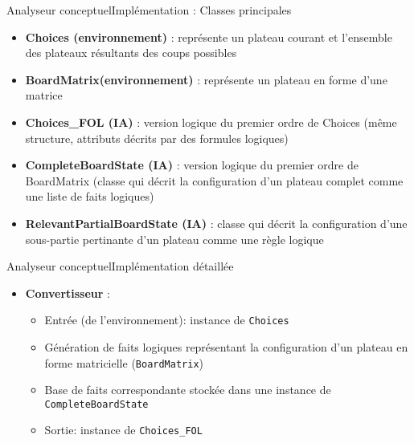 \begin{frame}{Analyseur conceptuel}{Implémentation : Classes principales}
\begin{itemize}
  \item \textbf {Choices (environnement)} : représente un plateau
  courant et l'ensemble des plateaux résultants des coups possibles
  \pause
  \item \textbf {BoardMatrix(environnement)} : représente un plateau en forme
  d'une matrice
  \pause
  \item \textbf {Choices\_FOL (IA)} : version logique du premier ordre de
  Choices (même structure, attributs décrits par des formules logiques)
  \pause
  \item \textbf {CompleteBoardState (IA)} : version logique du premier ordre de
  BoardMatrix (classe qui décrit la configuration
  d'un plateau complet comme une liste de faits logiques)
  \pause
  \item \textbf {RelevantPartialBoardState (IA)} : classe qui décrit la
  configuration d'une sous-partie pertinante d'un plateau comme une règle
  logique 
\end{itemize}
\end{frame}


\begin{frame}{Analyseur conceptuel}{Implémentation détaillée}
\begin{itemize}
  \item \textbf {Convertisseur} :
  \begin{itemize}
    \item Entrée (de l'environnement): instance de \texttt{Choices}
    \pause
    \item Génération de faits logiques représentant la configuration d'un
    plateau en forme matricielle (\texttt{BoardMatrix})
    \pause
    \item Base de faits correspondante stockée dans une instance de
    \texttt{CompleteBoardState}
    \pause
    \item Sortie: instance de
    \texttt{Choices\_FOL}
  \end{itemize}
\end{itemize}
\end{frame}

